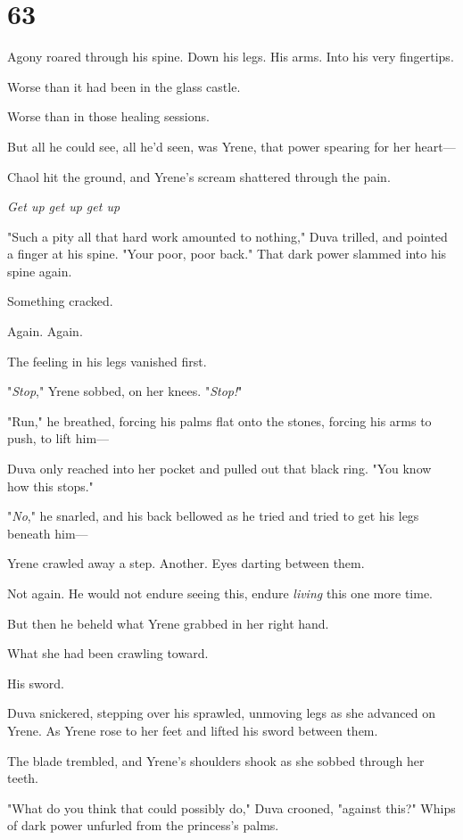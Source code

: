 
\chapter{63}

Agony roared through his spine.
Down his legs.
His arms.
Into his very fingertips.

Worse than it had been in the glass castle.

Worse than in those healing sessions.

But all he could see, all he'd seen, was Yrene, that power spearing for her heart---

Chaol hit the ground, and Yrene's scream shattered through the pain.

\emph{Get up get up get up}

"Such a pity all that hard work amounted to nothing," Duva trilled, and pointed a finger at his spine.
"Your poor, poor back."
That dark power slammed into his spine again.

Something cracked.

Again.
Again.

The feeling in his legs vanished first.

"\emph{Stop}," Yrene sobbed, on her knees.
"\emph{Stop!}"

"Run," he breathed, forcing his palms flat onto the stones, forcing his arms to push, to lift him---

Duva only reached into her pocket and pulled out that black ring.
"You know how this stops."

"\emph{No}," he snarled, and his back bellowed as he tried and tried to get his legs beneath him---

Yrene crawled away a step.
Another.
Eyes darting between them.

Not again.
He would not endure seeing this, endure \emph{living} this one more time.

But then he beheld what Yrene grabbed in her right hand.

What she had been crawling toward.

His sword.

Duva snickered, stepping over his sprawled, unmoving legs as she advanced on Yrene.
As Yrene rose to her feet and lifted his sword between them.

The blade trembled, and Yrene's shoulders shook as she sobbed through her teeth.

"What do you think that could possibly do," Duva crooned, "against this?"
Whips of dark power unfurled from the princess's palms.

